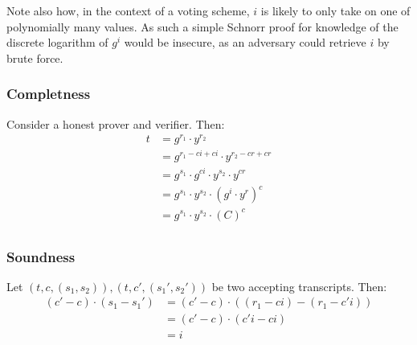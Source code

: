 \documentclass[a4paper]{scrreprt}
\begin{document}
Note also how, in the context of a voting scheme, $i$ is likely to only take on
one of polynomially many values. As such a simple Schnorr proof for knowledge
of the discrete logarithm of $g^i$ would be insecure, as an adversary could
retrieve $i$ by brute force.


\subsubsection{Completness}

Consider a honest prover and verifier. Then:
\begin{align*}
  t & = g^{r_1} \cdot y^{r_2} \\
    & = g^{r_1 - c i + c i} \cdot y^{r_2 - c r + c r} \\
    & = g^{s_1} \cdot g^{c i} \cdot y^{s_2} \cdot y^{c r} \\
    & = g^{s_1} \cdot y^{s_2} \cdot (g^i \cdot y^r)^c \\
    & = g^{s_1} \cdot y^{s_2} \cdot (C)^c \\
\end{align*}

\subsubsection{Soundness}

Let $(t, c, (s_1, s_2)), (t, c', (s_1', s_2'))$ be two accepting transcripts.
Then:
\begin{align*}
  (c' - c) \cdot (s_1 - s_1') & = (c' - c) \cdot ((r_1 - ci) - (r_1 - c' i)) \\
                              & = (c' - c) \cdot (c' i - ci) \\
                              & = i
\end{align*}
\end{document}
